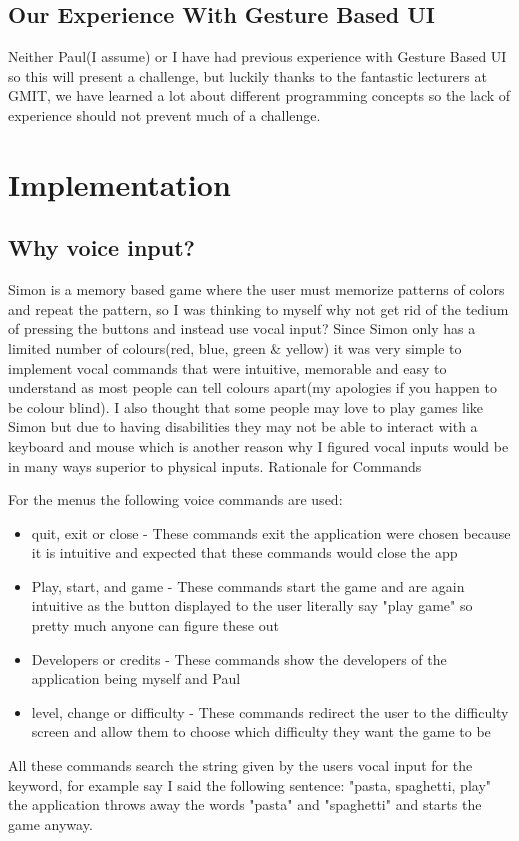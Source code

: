 \documentclass{article}
\begin{document}
\subsection{Our Experience With Gesture Based UI}
Neither Paul(I assume) or I have had previous experience with Gesture Based UI so this will present a challenge, but luckily thanks to the fantastic lecturers at GMIT, we have learned a lot about different programming concepts so the lack of experience should not prevent much of a challenge.
\section{Implementation}
\subsection{Why voice input?}
Simon is a memory based game where the user must memorize patterns of colors and repeat the pattern, so I was thinking to myself why not get rid of the tedium of pressing the buttons and instead use vocal input? Since Simon only has a limited number of colours(red, blue, green \& yellow) it was very simple to implement vocal commands that were intuitive, memorable and easy to understand as most people can tell colours apart(my apologies if you happen to be colour blind). I also thought that some people may love to play games like Simon but due to having disabilities they may not be able to interact with a keyboard and mouse which is another reason why I figured vocal inputs would be in many ways superior to physical inputs.
Rationale for Commands

For the menus the following voice commands are used:
\begin{itemize}
    \item quit, exit or close - These commands exit the application were chosen because it is intuitive and expected that these commands would close the app
    \item Play, start, and game - These commands start the game and are again intuitive as the button displayed to the user literally say "play game" so pretty much anyone can figure these out
    \item Developers or credits - These commands show the developers of the application being myself and Paul
    \item level, change or difficulty - These commands redirect the user to the difficulty screen and allow them to choose which difficulty they want the game to be
\end{itemize}
All these commands search the string given by the users vocal input for the keyword, for example say I said the following sentence: "pasta, spaghetti, play" the application throws away the words "pasta" and "spaghetti" and starts the game anyway.
\end{document}
